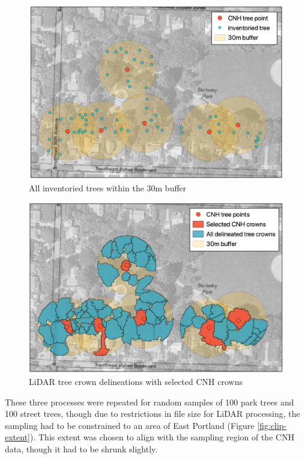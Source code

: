 \documentclass[12pt,twoside]{reedthesis}
\begin{document}
\begin{figure}

{\centering \includegraphics[width=1\linewidth]{figure/buffer_all_points} 

}

\caption{All inventoried trees within the 30m buffer}\label{fig:buffer-points}
\end{figure}
\begin{figure}

{\centering \includegraphics[width=1\linewidth]{figure/selected_lidar} 

}

\caption{LiDAR tree crown delineations with selected CNH crowns}\label{fig:unnamed-chunk-5}
\end{figure}
These three processes were repeated for random samples of 100 park trees and 100 street trees, though due to restrictions in file size for LiDAR processing, the sampling had to be constrained to an area of East Portland (Figure \ref{fig:clip-extent}). This extent was chosen to align with the sampling region of the CNH data, though it had to be shrunk slightly.
\end{document}
